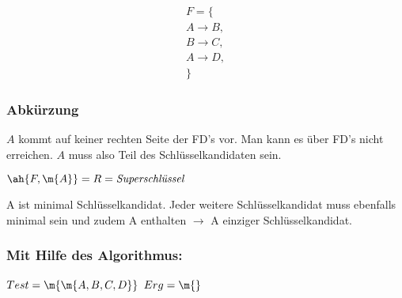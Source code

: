 \documentclass{lehramt-informatik-haupt}
\begin{document}
\begin{multline*}
F = \{ \\
  A \rightarrow B,\\
  B \rightarrow C,\\
  A \rightarrow D,\\
\}
\end{multline*}

%

\subsubsection{Abkürzung}

$A$ kommt auf keiner rechten Seite der FD’s vor.
Man kann es über FD's nicht erreichen. $A$ muss also Teil des
Schlüsselkandidaten sein.

$\ah{F, \m{A}} = R = \textit{Superschlüssel}$

A ist minimal Schlüsselkandidat.
%
Jeder weitere Schlüsselkandidat muss ebenfalls minimal sein und zudem
A enthalten $\rightarrow$ A einziger Schlüsselkandidat.

%

\subsubsection{Mit Hilfe des Algorithmus:}

$Test = \m{\m{A, B, C, D}}$ $Erg = \m{}$
\end{document}

